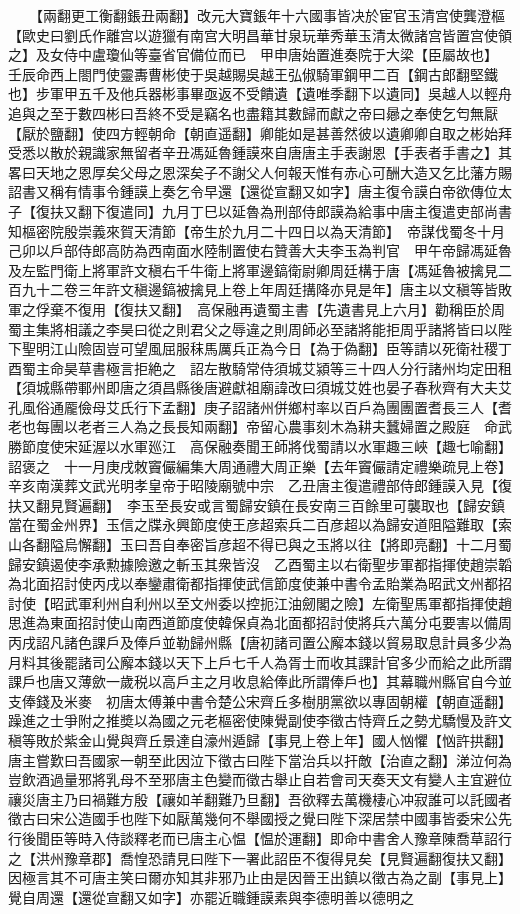 　　【兩翻更工衡翻鋹丑兩翻】改元大寶鋹年十六國事皆决於宦官玉清宫使龔澄樞【歐史曰劉氏作離宫以遊獵有南宫大明昌華甘泉玩華秀華玉清太微諸宫皆置宫使領之】及女侍中盧瓊仙等臺省官備位而已　甲申唐始置進奏院于大梁【臣屬故也】　壬辰命西上閤門使靈夀曹彬使于吳越賜吳越王弘俶騎軍鋼甲二百【鋼古郎翻堅鐵也】步軍甲五千及他兵器彬事畢亟返不受饋遺【遺唯季翻下以遺同】吳越人以輕舟追與之至于數四彬曰吾終不受是竊名也盡籍其數歸而獻之帝曰曏之奉使乞匄無厭【厭於鹽翻】使四方輕朝命【朝直遥翻】卿能如是甚善然彼以遺卿卿自取之彬始拜受悉以散於親識家無留者辛丑馮延魯鍾謨來自唐唐主手表謝恩【手表者手書之】其畧曰天地之恩厚矣父母之恩深矣子不謝父人何報天惟有赤心可酬大造又乞比藩方賜詔書又稱有情事令鍾謨上奏乞令早還【還從宣翻又如字】唐主復令謨白帝欲傳位太子【復扶又翻下復遣同】九月丁巳以延魯為刑部侍郎謨為給事中唐主復遣吏部尚書知樞密院殷崇義來賀天清節【帝生於九月二十四日以為天清節】　帝謀伐蜀冬十月己卯以戶部侍郎高防為西南面水陸制置使右贊善大夫李玉為判官　甲午帝歸馮延魯及左監門衛上將軍許文稹右千牛衛上將軍邊鎬衛尉卿周廷構于唐【馮延魯被擒見二百九十二卷三年許文稹邊鎬被擒見上卷上年周廷搆降亦見是年】唐主以文稹等皆敗軍之俘棄不復用【復扶又翻】　高保融再遺蜀主書【先遺書見上六月】勸稱臣於周蜀主集將相議之李昊曰從之則君父之辱違之則周師必至諸將能拒周乎諸將皆曰以陛下聖明江山險固豈可望風屈服秣馬厲兵正為今日【為于偽翻】臣等請以死衛社稷丁酉蜀主命昊草書極言拒絶之　詔左散騎常侍須城艾潁等三十四人分行諸州均定田租【須城縣帶鄆州即唐之須昌縣後唐避獻祖廟諱改曰須城艾姓也晏子春秋齊有大夫艾孔風俗通龎儉母艾氏行下孟翻】庚子詔諸州併鄉村率以百戶為團團置耆長三人【耆老也每團以老者三人為之長長知兩翻】帝留心農事刻木為耕夫蠶婦置之殿庭　命武勝節度使宋延渥以水軍廵江　高保融奏聞王師將伐蜀請以水軍趣三峽【趣七喻翻】詔褒之　十一月庚戌敇竇儼編集大周通禮大周正樂【去年竇儼請定禮樂疏見上卷】　辛亥南漢葬文武光明孝皇帝于昭陵廟號中宗　乙丑唐主復遣禮部侍郎鍾謨入見【復扶又翻見賢遍翻】　李玉至長安或言蜀歸安鎮在長安南三百餘里可襲取也【歸安鎮當在蜀金州界】玉信之牒永興節度使王彦超索兵二百彦超以為歸安道阻隘難取【索山各翻隘烏懈翻】玉曰吾自奉密旨彦超不得已與之玉將以往【將即亮翻】十二月蜀歸安鎮遏使李承勲據險邀之斬玉其衆皆沒　乙酉蜀主以右衛聖步軍都指揮使趙崇韜為北面招討使丙戌以奉鑾肅衛都指揮使武信節度使兼中書令孟貽業為昭武文州都招討使【昭武軍利州自利州以至文州委以控扼江油劒閣之險】左衛聖馬軍都指揮使趙思進為東面招討使山南西道節度使韓保貞為北面都招討使將兵六萬分屯要害以備周　丙戌詔凡諸色課戶及俸戶並勒歸州縣【唐初諸司置公廨本錢以貿易取息計員多少為月料其後罷諸司公廨本錢以天下上戶七千人為胥士而收其課計官多少而給之此所謂課戶也唐又薄歛一歲税以高戶主之月收息給俸此所謂俸戶也】其幕職州縣官自今並支俸錢及米麥　初唐太傅兼中書令楚公宋齊丘多樹朋黨欲以專固朝權【朝直遥翻】躁進之士爭附之推奬以為國之元老樞密使陳覺副使李徵古恃齊丘之勢尤驕慢及許文稹等敗於紫金山覺與齊丘景達自濠州遁歸【事見上卷上年】國人忷懼【忷許拱翻】唐主嘗歎曰吾國家一朝至此因泣下徵古曰陛下當治兵以扞敵【治直之翻】涕泣何為豈飲酒過量邪將乳母不至邪唐主色變而徵古舉止自若會司天奏天文有變人主宜避位禳災唐主乃曰禍難方殷【禳如羊翻難乃旦翻】吾欲釋去萬機棲心冲寂誰可以託國者徵古曰宋公造國手也陛下如厭萬幾何不舉國授之覺曰陛下深居禁中國事皆委宋公先行後聞臣等時入侍談釋老而已唐主心愠【愠於運翻】即命中書舍人豫章陳喬草詔行之【洪州豫章郡】喬惶恐請見曰陛下一署此詔臣不復得見矣【見賢遍翻復扶又翻】因極言其不可唐主笑曰爾亦知其非邪乃止由是因晉王出鎮以徵古為之副【事見上】覺自周還【還從宣翻又如字】亦罷近職鍾謨素與李德明善以德明之